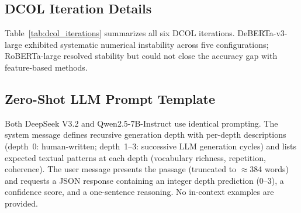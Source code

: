 \subsection{DCOL Iteration Details}
\label{app:dcol_iterations}

Table~\ref{tab:dcol_iterations} summarizes all six DCOL iterations.
DeBERTa-v3-large exhibited systematic numerical instability across five configurations; RoBERTa-large resolved stability but could not close the accuracy gap with feature-based methods.

\begin{table}[h]
\centering
\small
\caption{DCOL iteration summary. All experiments use Pythia-1.4B nucleus data. RF baseline: 78.7\%.}
\label{tab:dcol_iterations}
\end{table}

\subsection{Zero-Shot LLM Prompt Template}
\label{app:zeroshot_prompt}

Both DeepSeek V3.2 and Qwen2.5-7B-Instruct use identical prompting.
The system message defines recursive generation depth with per-depth descriptions (depth~0: human-written; depth~1--3: successive LLM generation cycles) and lists expected textual patterns at each depth (vocabulary richness, repetition, coherence).
The user message presents the passage (truncated to ${\approx}$384 words) and requests a JSON response containing an integer depth prediction (0--3), a confidence score, and a one-sentence reasoning.
No in-context examples are provided.

